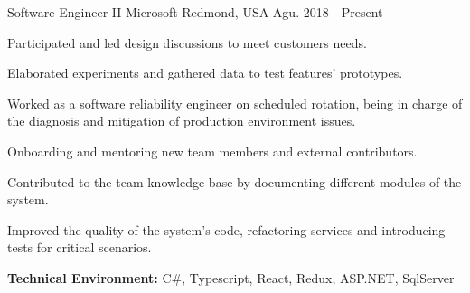
\begin{cventries}

\workexperienceentry
{Software Engineer II} %
{Microsoft} %
{Redmond, USA} %
{Agu. 2018 - Present} %
{ %
\begin{cvitems}
    \item {Participated and led design discussions to meet customers needs. }
    \item {Elaborated experiments and gathered data to test features' prototypes.}
    \item {Worked as a software reliability engineer on scheduled rotation, being in charge of the diagnosis and mitigation of production environment issues.} 
    \item {Onboarding and mentoring new team members and external contributors.} 
    \item {Contributed to the team knowledge base by documenting different modules of the system.}
    \item {Improved the quality of the system's code, refactoring services and introducing tests for critical scenarios.}
\end{cvitems}
}
{\textbf{Technical Environment:} C\#, Typescript, React, Redux, ASP.NET, SqlServer}



\end{cventries}
